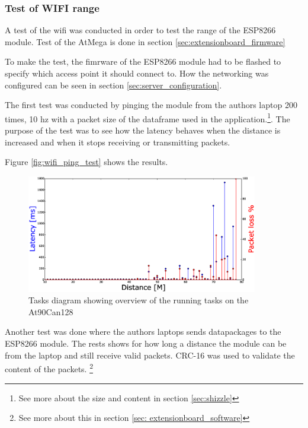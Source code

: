 \subsubsection*{Test of WIFI range}
A test of the wifi was conducted in order to test the range of the ESP8266 module. Test of the AtMega is done in section \ref{sec:extensionboard_firmware}

To make the test, the fimrware of the ESP8266 module had to be flashed to specify which access point it should connect to. How the networking was configured can be seen in section \ref{sec:server_configuration}.

The first test was conducted by pinging the module from the authors laptop 200 times, 10 hz with a packet size of the dataframe used in the application.\footnote{See more about the size and content in section \ref{sec:shizzle}}. The purpose of the test was to see how the latency behaves when the distance is increased and when it stops receiving or transmitting packets.

Figure \ref{fig:wifi_ping_test} shows the results.

\begin{figure}[H]
    \center
    \includegraphics[width=0.9\textwidth]{graphics/wifi_test_latency_1.eps}
  \caption{Tasks diagram showing overview of the running tasks on the At90Can128}
    \label{fig:wifi_pingtest}
\end{figure}

Another test was done where the authors laptops sends datapackages to the ESP8266 module. The rests shows for how long a distance the module can be from the laptop and still receive valid packets. CRC-16 was used to validate the content of the packets. \footnote{See more about this in section \ref{sec: extensionboard_software}}

